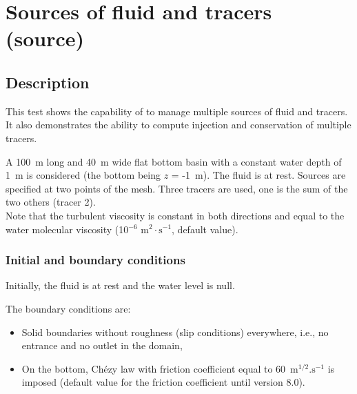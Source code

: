 \chapter{Sources of fluid and tracers (source)}

\section{Description}
\bigskip
This test shows the capability of  to manage multiple
sources of fluid and tracers.
It also demonstrates the ability to compute injection and conservation
of multiple tracers.

\bigskip
A 100~m long and 40~m wide flat bottom basin with a constant water depth of 1~m is
considered (the bottom being $z$ = -1~m). The fluid is at rest.
Sources are specified at two points of the mesh.
Three tracers are used, one is the sum of the two others (tracer 2).\\
Note that the turbulent viscosity is constant in both directions 
and equal to the water molecular viscosity (10$^{-6}$ m$^2\cdot\text{s}^{-1}$,
default value).

\subsection{Initial and boundary conditions}

\bigskip
Initially, the fluid is at rest and the water level is null.

\bigskip
The boundary conditions are:
\begin{itemize}
\item Solid boundaries without roughness (slip conditions) everywhere,
 i.e., no entrance and no outlet in the domain,
\item On the bottom, Chézy law with friction coefficient equal to 
60~$\text{m}^{1/2}.\text{s}^{-1}$ is imposed (default value
for the friction coefficient until version 8.0).
\end{itemize}

